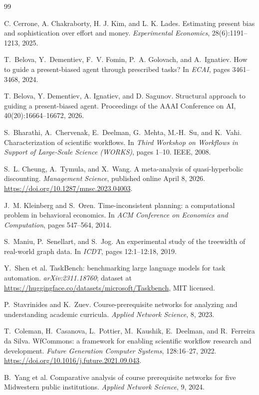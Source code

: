 \documentclass{article}
\begin{document}
\begin{thebibliography}{99}

C. Cerrone, A. Chakraborty, H. J. Kim, and L. K. Lades.
\newblock Estimating present bias and sophistication over effort and money.
\newblock \emph{Experimental Economics}, 28(6):1191--1213, 2025.

T.~Belova, Y.~Dementiev, F.~V. Fomin, P.~A. Golovach, and A.~Ignatiev.
\newblock How to guide a present-biased agent through prescribed tasks?
\newblock In \emph{ECAI}, pages 3461--3468, 2024.

T. Belova, Y. Dementiev, A. Ignatiev, and D. Sagunov.
\newblock Structural approach to guiding a present-biased agent.
\newblock Proceedings of the AAAI Conference on AI, 40(20):16664--16672, 2026.

S.~Bharathi, A.~Chervenak, E.~Deelman, G.~Mehta, M.-H.~Su, and K.~Vahi.
\newblock Characterization of scientific workflows.
\newblock In \emph{Third Workshop on Workflows in Support of Large-Scale Science (WORKS)}, pages 1--10. IEEE, 2008.

S.~L. Cheung, A.~Tymula, and X.~Wang.
\newblock A meta-analysis of quasi-hyperbolic discounting.
\newblock \emph{Management Science}, published online April 8, 2026.
\newblock \url{https://doi.org/10.1287/mnsc.2023.04003}.

J.~M. Kleinberg and S.~Oren.
\newblock Time-inconsistent planning: a computational problem in behavioral
economics.
\newblock In \emph{ACM Conference on Economics and Computation}, pages 547--564,
2014.

S.~Maniu, P.~Senellart, and S.~Jog.
\newblock An experimental study of the treewidth of real-world graph data.
\newblock In \emph{ICDT}, pages 12:1--12:18, 2019.

Y.~Shen et al.
\newblock TaskBench: benchmarking large language models for task automation.
\newblock \emph{arXiv:2311.18760}; dataset at
\url{https://huggingface.co/datasets/microsoft/Taskbench}, MIT licensed.

P.~Stavrinides and K.~Zuev.
\newblock Course-prerequisite networks for analyzing and understanding academic
curricula.
\newblock \emph{Applied Network Science}, 8, 2023.

T.~Coleman, H.~Casanova, L.~Pottier, M.~Kaushik, E.~Deelman, and R.~Ferreira da Silva.
\newblock WfCommons: a framework for enabling scientific workflow research and
development.
\newblock \emph{Future Generation Computer Systems}, 128:16--27, 2022.
\newblock \url{https://doi.org/10.1016/j.future.2021.09.043}.

B.~Yang et al.
\newblock Comparative analysis of course prerequisite networks for five Midwestern
public institutions.
\newblock \emph{Applied Network Science}, 9, 2024.

\end{thebibliography}
\end{document}
